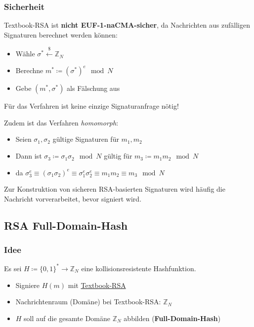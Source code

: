 \documentclass[12pt,A4]{extarticle}
\begin{document}
\subsubsection{Sicherheit}
Textbook-RSA ist \textbf{nicht EUF-1-naCMA-sicher}, da Nachrichten aus zufälligen Signaturen berechnet werden können:
\begin{itemize}
  \item{Wähle $\sigma^* \stackrel{\$}{\leftarrow} \mathbb{Z}_N$}
  \item{Berechne $m^* \coloneqq {(\sigma^*)}^e \mod N$}
  \item{Gebe $(m^*, \sigma^*)$ als Fälschung aus}
\end{itemize}
Für das Verfahren ist keine einzige Signaturanfrage nötig!\par
Zudem ist das Verfahren \textit{homomorph}:
\begin{itemize}
  \item{Seien $\sigma_1, \sigma_2$ gültige Signaturen für $m_1, m_2$}
  \item{Dann ist $\sigma_3 \coloneqq \sigma_1 \sigma_2 \mod N$ gültig für $m_3 \coloneqq m_1 m_2 \mod N$}
  \item{da $\sigma^e_3 \equiv {(\sigma_1 \sigma_2)}^e \equiv \sigma^e_1 \sigma^e_2 \equiv m_1 m_2 \equiv m_3 \mod N$}
\end{itemize}
Zur Konstruktion von sicheren RSA-basierten Signaturen wird häufig die Nachricht vorverarbeitet, bevor signiert wird.

\subsection{RSA Full-Domain-Hash}
\subsubsection{Idee}
Es sei $H \coloneqq {\{0, 1\}}^* \rightarrow \mathbb{Z}_N$ eine kollisionsresistente Hashfunktion.
\begin{itemize}
  \item{Signiere $H(m)$ mit \hyperref[sec:textbook-rsa]{Textbook-RSA}}
  \item{Nachrichtenraum (Domäne) bei Textbook-RSA: $\mathbb{Z}_N$}
  \item{$H$ soll auf die gesamte Domäne $\mathbb{Z}_N$ abbilden (\textbf{Full-Domain-Hash})}
\end{itemize}
\end{document}
